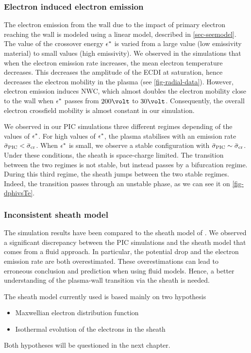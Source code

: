  
  \subsubsection*{Electron induced electron emission}
  
  The electron  emission from the wall due to the impact of primary electron reaching the wall is modeled using a linear model, described in \cref{sec-seemodel}.
  The value of the crossover energy $\epsilon^{*}$ is varied from a large value (low emissivity material) to small values (high emissivity).
  We observed in the simulations that when the electron emission rate increases, the mean electron temperature decreases.
  This decreases the amplitude of the \ac{ECDI} at saturation, hence decreases the electron mobility in the plasma (see \cref{fig-radial-data}).
  However, electron emission induces \ac{NWC}, which almost doubles the electron mobility close to the wall when $\epsilon^{*}$ passes from $200\volt$ to $30\volt$.
  Consequently, the overall electron crossfield mobility is almost constant in our simulation.
  
  We observed in our \ac{PIC} simulations three different regimes depending of the values of $\epsilon^{*}$.
  For high values of $\epsilon^{*}$, the plasma stabilises with an emission rate $ \bar{\sigma }_{\rm PIC} <  \bar{\sigma }_{\rm cr}$.
  When $\epsilon^{*}$ is small, we observe a stable configuration with $ \bar{\sigma }_{\rm PIC} \sim  \bar{\sigma }_{\rm cr}$.
  Under these conditions, the sheath is space-charge limited.
  The transition between the two regimes is not stable, but instead passes by a bifurcation regime.
  During this third regime, the sheath jumps between the two stable regimes.
  Indeed, the transition passes through an unstable phase, as we can see it on \cref{fig-dphivsTe}.
  

  \subsubsection*{Inconsistent sheath model }
  
  The simulation results have been compared to the sheath model of \citet{hobbs1967}.
  We observed a significant discrepancy between the \ac{PIC} simulations and the sheath model that comes from a fluid approach.
  In particular, the potential drop and the electron emission rate are both overestimated.
  These overestimations can lead to erroneous conclusion and prediction when using fluid models.
  Hence, a better understanding of the plasma-wall transition via the sheath is needed.
  
  The sheath model currently used is based mainly on two hypothesis
  \begin{itemize}
    \item Maxwellian electron distribution function
    \item Isothermal evolution of the electrons in the sheath
  \end{itemize}
  
  Both hypotheses will be questioned in the next chapter.
  
